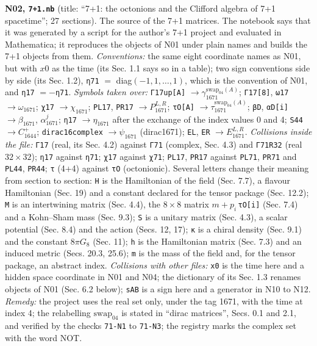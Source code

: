\documentclass[
  10pt,
]{article}
\begin{document}
\textbf{N02, \texttt{7+1.nb}} (title: ``7+1: the octonions and the
Clifford algebra of 7+1 spacetime''; 27 sections). The source of the 7+1
matrices. The notebook says that it was generated by a script for the
author's 7+1 project and evaluated in Mathematica; it reproduces the
objects of N01 under plain names and builds the 7+1 objects from them.
\emph{Conventions:} the same eight coordinate names as N01, but with
\(x0\) as the time (its Sec. 1.1 says so in a table); two sign
conventions side by side (its Sec. 1.2), \texttt{η71} \(=\)
diag\((-1,1,\dots,1)\), which is the convention of N01, and \texttt{η17}
\(=-\)\texttt{η71}. \emph{Symbols taken over:} \texttt{Γ17up{[}A{]}}
\(\to\gamma_{1671}^{\mathrm{swap}_{04}(A)}\); \texttt{Γ17{[}8{]}},
\texttt{ω17} \(\to\omega_{1671}\); \texttt{χ17} \(\to\chi_{1671}\);
\texttt{PL17}, \texttt{PR17} \(\to P_{1671}^{L,R}\); \texttt{τO{[}A{]}}
\(\to\tau_{1671}^{\mathrm{swap}_{04}(A)}\); \texttt{βD},
\texttt{αD{[}i{]}} \(\to\beta_{1671}\), \(\alpha_{1671}^{j}\);
\texttt{η17} \(\to\eta_{1671}\) after the exchange of the index values 0
and 4; \texttt{S44} \(\to C_{1644}^{+}\); \texttt{dirac16complex}
\(\to\psi_{1671}\) (dirac1671); \texttt{EL}, \texttt{ER}
\(\to E_{1671}^{L,R}\). \emph{Collisions inside the file:} \texttt{Γ17}
(real, its Sec. 4.2) against \texttt{Γ71} (complex, Sec. 4.3) and
\texttt{Γ71R32} (real \(32\times32\)); \texttt{η17} against
\texttt{η71}; \texttt{χ17} against \texttt{χ71}; \texttt{PL17},
\texttt{PR17} against \texttt{PL71}, \texttt{PR71} and \texttt{PL44},
\texttt{PR44}; \texttt{τ} (4+4) against \texttt{τO} (octonionic).
Several letters change their meaning from section to section: \texttt{H}
is the Hamiltonian of the field (Sec. 7.7), a flavour Hamiltonian (Sec.
19) and a constant declared for the tensor package (Sec. 12.2);
\texttt{M} is an intertwining matrix (Sec. 4.4), the \(8\times8\) matrix
\(m+p_i\,\)\texttt{τO{[}i{]}} (Sec. 7.4) and a Kohn--Sham mass (Sec.
9.3); \texttt{S} is a unitary matrix (Sec. 4.3), a scalar potential
(Sec. 8.4) and the action (Secs. 12, 17); \texttt{κ} is a chiral density
(Sec. 9.1) and the constant \(8\pi G_8\) (Sec. 11); \texttt{h} is the
Hamiltonian matrix (Sec. 7.3) and an induced metric (Secs. 20.3, 25.6);
\texttt{m} is the mass of the field and, for the tensor package, an
abstract index. \emph{Collisions with other files:} \texttt{x0} is the
time here and a hidden space coordinate in N01 and N04; the dictionary
of its Sec. 1.3 renames objects of N01 (Sec. 6.2 below); \texttt{sAB} is
a sign here and a generator in N10 to N12. \emph{Remedy:} the project
uses the real set only, under the tag 1671, with the time at index 4;
the relabelling \(\mathrm{swap}_{04}\) is stated in ``dirac matrices'',
Secs. 0.1 and 2.1, and verified by the checks \texttt{71-N1} to
\texttt{71-N3}; the registry marks the complex set with the word NOT.
\end{document}
